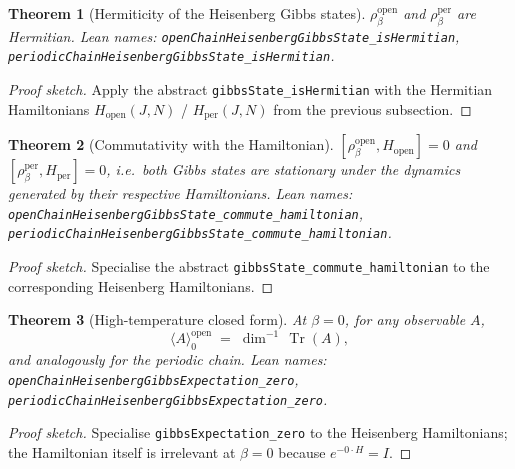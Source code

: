 \documentclass[a4paper,11pt]{article}
\newtheorem{theorem}{Theorem}
\begin{document}
\begin{theorem}[Hermiticity of the Heisenberg Gibbs states]
$\rho_\beta^{\mathrm{open}}$ and $\rho_\beta^{\mathrm{per}}$ are Hermitian.
Lean names: \texttt{openChainHeisenbergGibbsState\_isHermitian},
\texttt{periodicChainHeisenbergGibbsState\_isHermitian}.
\end{theorem}

\begin{proof}[Proof sketch]
Apply the abstract \texttt{gibbsState\_isHermitian} with the Hermitian
Hamiltonians $H_{\mathrm{open}}(J,N)$ /
$H_{\mathrm{per}}(J,N)$ from the previous subsection.
\end{proof}

\begin{theorem}[Commutativity with the Hamiltonian]
$[\rho_\beta^{\mathrm{open}}, H_{\mathrm{open}}] = 0$ and
$[\rho_\beta^{\mathrm{per}}, H_{\mathrm{per}}] = 0$, i.e.\ both Gibbs
states are stationary under the dynamics generated by their respective
Hamiltonians.
Lean names:
\texttt{openChainHeisenbergGibbsState\_commute\_hamiltonian},
\texttt{periodicChainHeisenbergGibbsState\_commute\_hamiltonian}.
\end{theorem}

\begin{proof}[Proof sketch]
Specialise the abstract
\texttt{gibbsState\_commute\_hamiltonian} to the corresponding
Heisenberg Hamiltonians.
\end{proof}

\begin{theorem}[High-temperature closed form]
At $\beta = 0$, for any observable $A$,
\[
  \langle A \rangle_0^{\mathrm{open}}
  \;=\; \dim^{-1}\,\operatorname{Tr}(A),
\]
and analogously for the periodic chain.
Lean names:
\texttt{openChainHeisenbergGibbsExpectation\_zero},
\texttt{periodicChainHeisenbergGibbsExpectation\_zero}.
\end{theorem}

\begin{proof}[Proof sketch]
Specialise \texttt{gibbsExpectation\_zero} to the Heisenberg
Hamiltonians; the Hamiltonian itself is irrelevant at $\beta = 0$ because
$e^{-0 \cdot H} = I$.
\end{proof}
\end{document}
